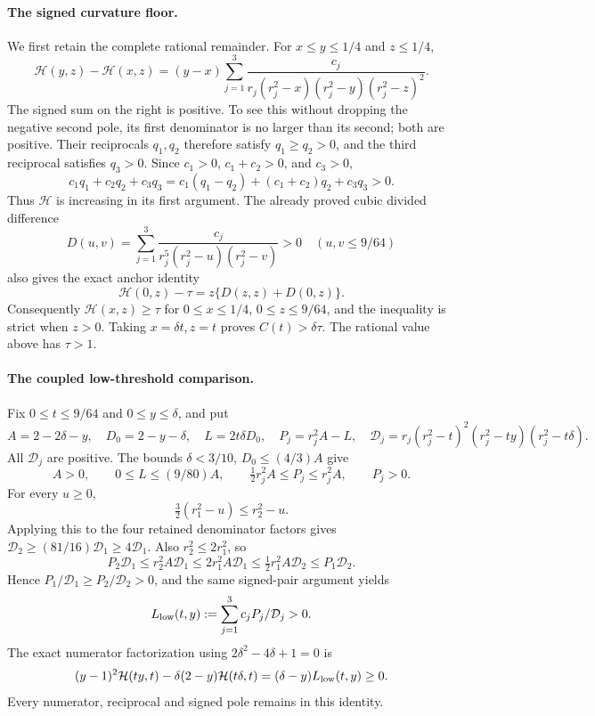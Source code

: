 \paragraph{The signed curvature floor.}
We first retain the complete rational remainder.  For
\(x\le y\le1/4\) and \(z\le1/4\),
\[
 \mathcal H(y,z)-\mathcal H(x,z)
 =(y-x)\sum_{j=1}^3
 \frac{c_j}{r_j(r_j^2-x)(r_j^2-y)(r_j^2-z)^2}.
\]
The signed sum on the right is positive.  To see this without dropping
the negative second pole, its first denominator is no larger than its
second; both are positive.  Their reciprocals \(q_1,q_2\) therefore
satisfy \(q_1\ge q_2>0\), and the third reciprocal satisfies \(q_3>0\).
Since \(c_1>0\), \(c_1+c_2>0\), and \(c_3>0\),
\[
 c_1q_1+c_2q_2+c_3q_3
  =c_1(q_1-q_2)+(c_1+c_2)q_2+c_3q_3>0.
\]
Thus \(\mathcal H\) is increasing in its first argument.
The already proved cubic divided difference
\[
 D(u,v)=\sum_{j=1}^3
 \frac{c_j}{r_j^5(r_j^2-u)(r_j^2-v)}>0
 \quad(u,v\le9/64)
\]
also gives the exact anchor identity
\[
 \mathcal H(0,z)-\tau=z\{D(z,z)+D(0,z)\}.
\]
Consequently \(\mathcal H(x,z)\ge\tau\) for
\(0\le x\le1/4\), \(0\le z\le9/64\), and the inequality is strict
when \(z>0\).  Taking \(x=\delta t,z=t\) proves
\(C(t)>\delta\tau\).  The rational value above has \(\tau>1\).

\paragraph{The coupled low-threshold comparison.}
Fix \(0\le t\le9/64\) and \(0\le y\le\delta\), and put
\[
 A=2-2\delta-y,\quad D_0=2-y-\delta,\quad L=2t\delta D_0,
 \quad P_j=r_j^2A-L,\quad
 \mathcal D_j=r_j(r_j^2-t)^2(r_j^2-ty)(r_j^2-t\delta).
\]
All \(\mathcal D_j\) are positive.
The bounds \(\delta<3/10\), \(D_0\le(4/3)A\) give
\[
 A>0,\qquad 0\le L\le(9/80)A,\qquad
 \tfrac12r_j^2A\le P_j\le r_j^2A,\qquad P_j>0.
\]
For every \(u\ge0\),
\[
 \tfrac32(r_1^2-u)\le r_2^2-u.
\]
Applying this to the four retained denominator factors gives
\(\mathcal D_2\ge(81/16)\mathcal D_1\ge4\mathcal D_1\).
Also \(r_2^2\le2r_1^2\), so
\[
 P_2\mathcal D_1
 \le r_2^2A\mathcal D_1
 \le2r_1^2A\mathcal D_1
 \le\tfrac12r_1^2A\mathcal D_2
 \le P_1\mathcal D_2.
\]
Hence \(P_1/\mathcal D_1\ge P_2/\mathcal D_2>0\), and the same
signed-pair argument yields
\[
 L_{\rm low}(t,y):=\sum_{j=1}^3c_jP_j/\mathcal D_j>0.
\]
The exact numerator factorization using
\(2\delta^2-4\delta+1=0\) is
\[
 (y-1)^2\mathcal H(ty,t)
  -\delta(2-y)\mathcal H(t\delta,t)
   =(\delta-y)L_{\rm low}(t,y)\ge0.
\]
Every numerator, reciprocal and signed pole remains in this identity.

